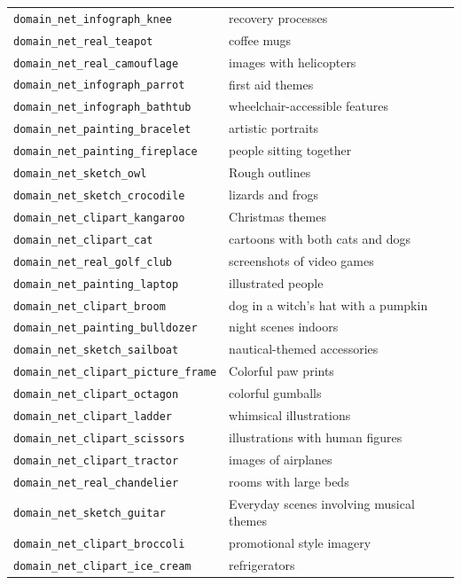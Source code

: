 \documentclass{article} %
\begin{document}
\begin{longtable}{p{} p{}}
\texttt{domain\_net\_infograph\_knee} & recovery processes \\
\texttt{domain\_net\_real\_teapot} & coffee mugs \\
\texttt{domain\_net\_real\_camouflage} & images with helicopters \\
\texttt{domain\_net\_infograph\_parrot} & first aid themes \\
\texttt{domain\_net\_infograph\_bathtub} & wheelchair-accessible features \\
\texttt{domain\_net\_painting\_bracelet} & artistic portraits \\
\texttt{domain\_net\_painting\_fireplace} & people sitting together \\
\texttt{domain\_net\_sketch\_owl} & Rough outlines \\
\texttt{domain\_net\_sketch\_crocodile} & lizards and frogs \\
\texttt{domain\_net\_clipart\_kangaroo} & Christmas themes \\
\texttt{domain\_net\_clipart\_cat} & cartoons with both cats and dogs \\
\texttt{domain\_net\_real\_golf\_club} & screenshots of video games \\
\texttt{domain\_net\_painting\_laptop} & illustrated people \\
\texttt{domain\_net\_clipart\_broom} & dog in a witch's hat with a pumpkin \\
\texttt{domain\_net\_painting\_bulldozer} & night scenes indoors \\
\texttt{domain\_net\_sketch\_sailboat} & nautical-themed accessories \\
\texttt{domain\_net\_clipart\_picture\_frame} & Colorful paw prints \\
\texttt{domain\_net\_clipart\_octagon} & colorful gumballs \\
\texttt{domain\_net\_clipart\_ladder} & whimsical illustrations \\
\texttt{domain\_net\_clipart\_scissors} & illustrations with human figures \\
\texttt{domain\_net\_clipart\_tractor} & images of airplanes \\
\texttt{domain\_net\_real\_chandelier} & rooms with large beds \\
\texttt{domain\_net\_sketch\_guitar} & Everyday scenes involving musical themes \\
\texttt{domain\_net\_clipart\_broccoli} & promotional style imagery \\
\texttt{domain\_net\_clipart\_ice\_cream} & refrigerators \\

\end{longtable}
\end{document}
